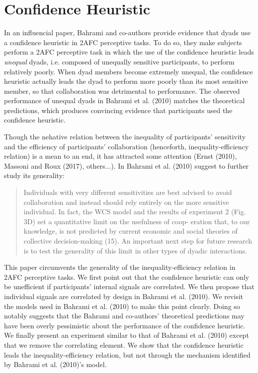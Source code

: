 \documentclass[12pt]{report}
\begin{document}
\chapter*{Confidence Heuristic}
In an influencial paper, Bahrami and co-authors provide evidence that dyads use a confidence heuristic in 2AFC perceptive tasks. To do so, they make subjects perform a 2AFC perceptive task in which the use of the confidence heuristic leads \textit{unequal} dyads, i.e. composed of unequally sensitive participants, to perform relatively poorly. When dyad members become extremely unequal, the confidence heuristic actually leads the dyad to perform more poorly than its most sensitive member, so that collaboration was detrimental to performance. The observed performance of unequal dyads in Bahrami et al. (2010) matches the theoretical predictions, which produces convincing evidence that participants used the confidence heuristic. 

Though the nehative relation between the inequality of participants' sensitivity and the efficiency of participants' collaboration (henceforth, inequality-efficiency relation) is a mean to an end, it has attracted some attention (Ernst (2010), Massoni and Roux (2017), others...). In Bahrami et al. (2010) suggest to further study its generality: 

\begin{quote} Individuals with very
different sensitivities are best advised to avoid
collaboration and instead should rely entirely on
the more sensitive individual. In fact, the WCS
model and the results of experiment 2 (Fig. 3D)
set a quantitative limit on the usefulness of coop-
eration that, to our knowledge, is not predicted by
current economic and social theories of collective
decision-making (15). An important next step for
future research is to test the generality of this limit
in other types of dyadic interactions. \end{quote}

This paper circumvents the generality of the inequality-efficiency relation in 2AFC perceptive tasks. We first point out that the confidence heuristic can only be unefficient if participants' internal signals are correlated. We then propose that individual signals are correlated by design in Bahrami et al. (2010). We revisit the models used in Bahrami et al. (2010) to make this point clearly. Doing so notably suggests that the Bahrami and co-authors' theoretical predictions may have been overly pessimistic about the performance of the confidence heuristic. We finally present an experiment similar to that of Bahrami et al. (2010) except that we remove the correlating element. We show that the confidence heuristic leads the inequality-efficiency relation, but not through the mechanism identified by Bahrami et al. (2010)'s model. 
\end{document}

